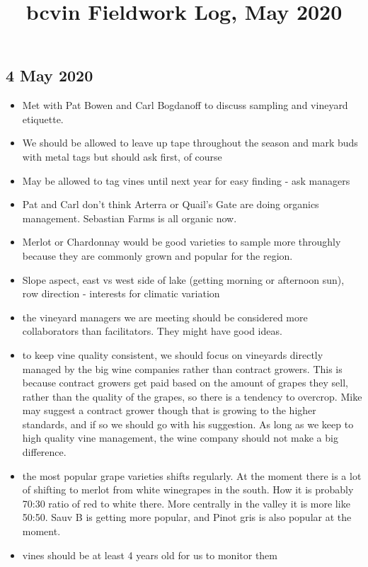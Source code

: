 \documentclass[11pt,letter]{article}
\newenvironment{smitemize}{
\begin{itemize}
  \setlength{\itemsep}{0pt}
  \setlength{\parskip}{0.8pt}
  \setlength{\parsep}{0pt}}
{\end{itemize}
}
\begin{document}

\renewcommand{\refname}{\CHead{}}

\title{bcvin Fieldwork Log, May 2020}
\author{}
\maketitle
\tableofcontents

\subsection{4 May 2020}
\begin{smitemize}
\item Met with Pat Bowen and Carl Bogdanoff to discuss sampling and vineyard etiquette.
\item We should be allowed to leave up tape throughout the season and mark buds with metal tags but should ask first, of course
\item May be allowed to tag vines until next year for easy finding - ask managers
\item Pat and Carl don't think Arterra or Quail's Gate are doing organics management. Sebastian Farms is all organic now.
\item Merlot or Chardonnay would be good varieties to sample more throughly because they are commonly grown and popular for the region.
\item Slope aspect, east vs west side of lake (getting morning or afternoon sun), row direction - interests for climatic variation
\item the vineyard managers we are meeting should be considered more collaborators than facilitators. They might have good ideas.
\item to keep vine quality consistent, we should focus on vineyards directly managed by the big wine companies rather than contract growers. This is because contract growers get paid based on the amount of grapes they sell, rather than the quality of the grapes, so there is a tendency to overcrop. Mike may suggest a contract grower though that is growing to the higher standards, and if so we should go with his suggestion. As long as we keep to high quality vine management, the wine company should not make a big difference.
\item the most popular grape varieties shifts regularly. At the moment there is a lot of shifting to merlot from white winegrapes in the south. How it is probably 70:30 ratio of red to white there. More centrally in the valley it is more like 50:50. Sauv B is getting more popular, and Pinot gris is also popular at the moment.
\item vines should be at least 4 years old for us to monitor them

\end{smitemize}
\end{document}
